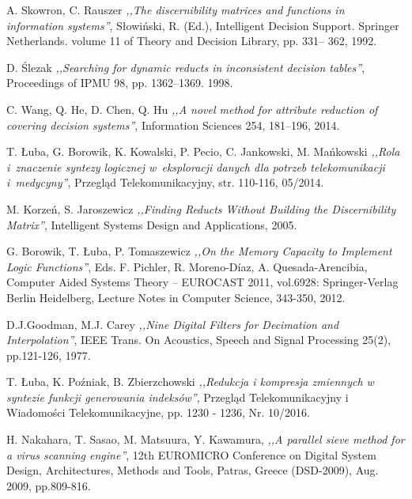 \begin{thebibliography}{99}
 A. Skowron, C. Rauszer \emph{,,The discernibility matrices and functions in information systems''}, Słowiński, R. (Ed.), Intelligent Decision Support. Springer Netherlands. volume 11 of Theory and Decision Library, pp. 331– 362, 1992.

 D. Ślezak \emph{,,Searching for dynamic reducts in inconsistent decision tables''}, Proceedings of IPMU 98, pp. 1362–1369. 1998.

 C. Wang, Q. He, D. Chen, Q. Hu \emph{,,A novel method for attribute reduction of covering decision systems''}, Information Sciences 254, 181–196, 2014.

 T. Łuba, G. Borowik, K. Kowalski, P. Pecio, C. Jankowski, M. Mańkowski \emph{,,Rola i~znaczenie syntezy logicznej w~eksploracji danych dla potrzeb telekomunikacji i~medycyny''}, Przegląd Telekomunikacyjny, str. 110-116, 05/2014.

 M. Korzeń, S. Jaroszewicz \emph{,,Finding Reducts Without Building the Discernibility Matrix''}, Intelligent Systems Design and Applications, 2005.

 G. Borowik, T. Łuba, P. Tomaszewicz \emph{,,On the Memory Capacity to Implement Logic Functions''}, Eds. F. Pichler, R. Moreno-Díaz, A. Quesada-Arencibia, Computer Aided Systems Theory – EUROCAST 2011, vol.6928: Springer-Verlag Berlin Heidelberg, Lecture Notes in Computer Science, 343-350, 2012.

 D.J.Goodman, M.J. Carey \emph{,,Nine Digital Filters for Decimation and Interpolation''}, IEEE Trans. On Acoustics, Speech and Signal Processing 25(2), pp.121-126, 1977.

 T. Łuba, K. Poźniak, B. Zbierzchowski \emph{,,Redukcja i kompresja zmiennych w syntezie funkcji generowania indeksów''}, Przegląd Telekomunikacyjny i Wiadomości Telekomunikacyjne, pp. 1230 - 1236, Nr. 10/2016.

 H. Nakahara, T. Sasao, M. Matsuura, Y. Kawamura, \emph{,,A parallel sieve method for a virus scanning engine''}, 12th EUROMICRO Conference on Digital System Design, Architectures, Methods and Tools, Patras, Greece (DSD-2009), Aug. 2009, pp.809-816.

\end{thebibliography}
\clearpage




